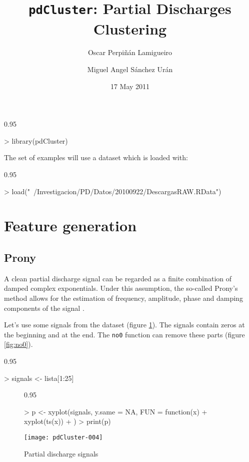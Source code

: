 \documentclass{article}
\renewenvironment{Schunk}{\begin{center}
    \scriptsize
    \begin{boxedminipage}{0.95\textwidth}}{
    \end{boxedminipage}\end{center}}
\begin{document}

\title{\texttt{pdCluster}: Partial Discharges Clustering} 


\author{Oscar Perpiñán Lamigueiro \and Miguel Angel Sánchez Urán}


\date{17 May 2011}

\maketitle

\begin{Schunk}
\begin{Sinput}
> library(pdCluster)
\end{Sinput}
\end{Schunk}

The set of examples will use a dataset which is loaded with:
\begin{Schunk}
\begin{Sinput}
> load("~/Investigacion/PD/Datos/20100922/DescargasRAW.RData")
\end{Sinput}
\end{Schunk}
\section{Feature generation}

\subsection{Prony}
\label{sec:prony}
A clean partial discharge signal can be regarded as a finite combination of
damped complex exponentials. Under this assumption, the so-called
Prony's method allows for the estimation of frequency, amplitude,
phase and damping components of the signal
\cite{Kumaresan.Tufts1982,Hauer.Demeure.ea1990,Kumaresan.Tufts.ea1984}.

Let's use some signals from the dataset (figure
\ref{fig:pd_signal}). The signals contain zeros at the beginning and
at the end. The \texttt{no0} function can remove these parts (figure \ref{fig:no0}).
\begin{Schunk}
\begin{Sinput}
> signals <- lista[1:25]
\end{Sinput}
\end{Schunk}

\begin{figure}
  \centering
\begin{Schunk}
\begin{Sinput}
> p <- xyplot(signals, y.same = NA, FUN = function(x) {
+     xyplot(ts(x))
+ })
> print(p)
\end{Sinput}
\end{Schunk}
\texttt{[image: pdCluster-004]}
  \caption{Partial discharge signals}
  \label{fig:pd_signal}
\end{figure}
\end{document}
